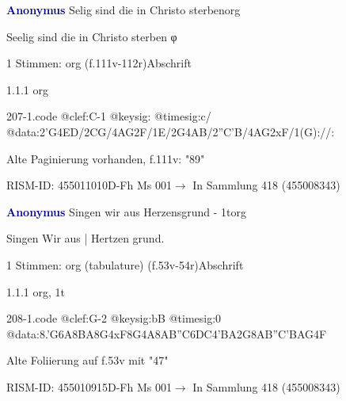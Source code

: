 \documentclass[twocolumn]{book}
\begin{document}
\par \vspace{7pt} \textcolor{darkblue}{\textbf{Anonymus  }}\hfillplus{\textbf{[207]}}\newline Selig sind die in Christo sterben\newline org
\par \begin{itshape} Seelig sind die in Christo sterben φ\end{itshape} 
\par \textcolor{darkblue}{}  1 Stimmen: org  (f.111v-112r)\newline Abschrift
\par 1.1.1  org  
\begin{filecontents*}{207-1.code}
@clef:C-1
@keysig:
@timesig:c/
@data:2'G4ED/2CG/4AG2F/1E/2G4AB/2''C'B/4AG2xF/1(G)://:
\end{filecontents*}
\newline
%
\par Alte Paginierung vorhanden, f.111v: "89"
\par RISM-ID: 455011010\newline D-Fh  Ms 001\newline $\rightarrow$ In Sammlung 418 (455008343)
      
\par \vspace{7pt} \textcolor{darkblue}{\textbf{Anonymus  }}\hfillplus{\textbf{[208]}}\newline Singen wir aus Herzensgrund - 1t\newline org
\par \begin{itshape}[f.53v, at left:] Singen Wir aus | Hertzen grund.\end{itshape} 
\par \textcolor{darkblue}{}  1 Stimmen: org (tabulature)  (f.53v-54r)\newline Abschrift
\par 1.1.1  org, 1t  
\begin{filecontents*}{208-1.code}
@clef:G-2
@keysig:bB
@timesig:0
@data:8.'G6A{8BA}8G4xF8G4A{8AB''C6DC}4'BA2G{8AB''C'B}{AG}4F
\end{filecontents*}
\newline
%
\par Alte Foliierung auf f.53v mit "47"
\par RISM-ID: 455010915\newline D-Fh  Ms 001\newline $\rightarrow$ In Sammlung 418 (455008343)
      
\end{document}

